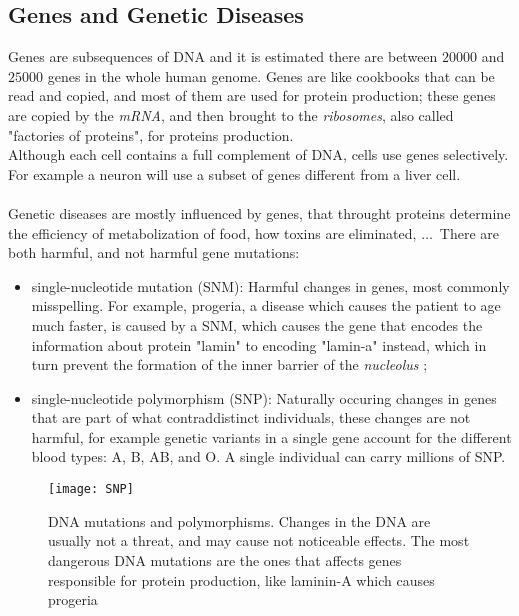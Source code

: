 \documentclass[12pt]{article}
\begin{document}
\subsection{Genes and Genetic Diseases}
Genes are subsequences of DNA and it is estimated there are between $20000$ and $25000$ genes in the whole human genome. 
Genes are like cookbooks that can be read and copied, and most of them are used for protein production; these genes are copied by the \emph{mRNA}, and then brought to the \emph{ribosomes}, 
 also called "factories of proteins", for proteins production.\\
Although each cell contains a full complement of DNA, cells use genes selectively. For example a neuron will use a subset of genes different from a liver cell.\\
\\
Genetic diseases are mostly influenced by genes, that throught proteins determine the efficiency of metabolization of food, how toxins are eliminated, $\dots$\
There are both harmful, and not harmful gene mutations:
\begin{itemize}
    \item single-nucleotide mutation (SNM): Harmful changes in genes, most commonly misspelling. For example, progeria, a disease which causes the patient to age much faster, is caused by a SNM, which causes the gene that encodes the information about protein "lamin" to encoding "lamin-a" instead, which in turn prevent the formation of the inner barrier of the \emph{nucleolus} \cite{understanding_genetics};
    \item single-nucleotide polymorphism (SNP): Naturally occuring changes in genes that are part of what contraddistinct individuals, these changes are not harmful, for example genetic variants in a single gene account for the different blood types: A, B, AB, and O. A single individual can carry millions of SNP.
\end{itemize}
\begin{figure}[H]
    \centering
    \texttt{[image: SNP]}
    \caption{DNA mutations and polymorphisms. Changes in the DNA are usually not a threat, and may cause not noticeable effects. The most dangerous DNA mutations are the ones that affects genes responsible for protein production, like laminin-A which causes progeria \cite{understanding_genetics}}
    \label{img:SNP}
\end{figure}
\end{document}
